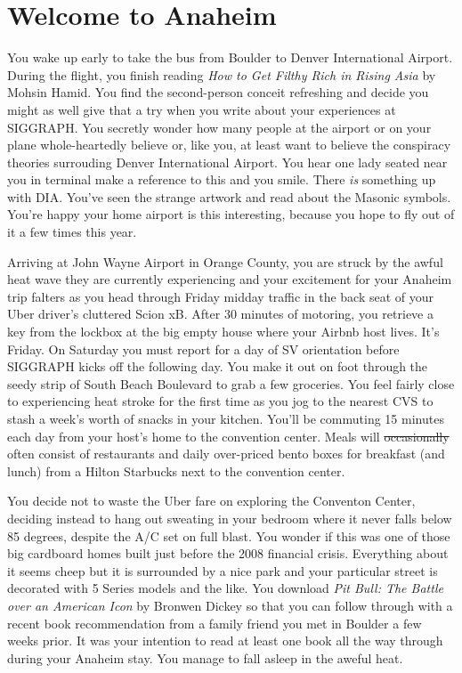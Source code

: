 \documentclass[../main.tex]{subfiles}
\begin{document}
\section{Welcome to Anaheim}

You wake up early to take the bus from Boulder to Denver International Airport. During the flight, you finish reading \textit{How to Get Filthy Rich in Rising Asia} by Mohsin Hamid. You find the second-person conceit refreshing and decide you might as well give that a try when you write about your experiences at SIGGRAPH. You secretly wonder how many people at the airport or on your plane whole-heartedly believe or, like you, at least want to believe the conspiracy theories surrouding Denver International Airport. You hear one lady seated near you in terminal make a reference to this and you smile. There \textit{is} something up with DIA. You've seen the strange artwork and read about the Masonic symbols. You're happy your home airport is this interesting, because you hope to fly out of it a few times this year.

Arriving at John Wayne Airport in Orange County, you are struck by the awful heat wave they are currently experiencing and your excitement for your Anaheim trip falters as you head through Friday midday traffic in the back seat of your Uber driver's cluttered Scion xB. After 30 minutes of motoring, you retrieve a key from the lockbox at the big empty house where your Airbnb host lives. It's Friday. On Saturday you must report for a day of SV orientation before SIGGRAPH kicks off the following day. You make it out on foot through the seedy strip of South Beach Boulevard to grab a few groceries. You feel fairly close to experiencing heat stroke for the first time as you jog to the nearest CVS to stash a week's worth of snacks in your kitchen. You'll be commuting 15 minutes each day from your host's home to the convention center. Meals will \sout{occasionally} often consist of restaurants and daily over-priced bento boxes for breakfast (and lunch) from a Hilton Starbucks next to the convention center.

You decide not to waste the Uber fare on exploring the Conventon Center, deciding instead to hang out sweating in your bedroom where it never falls below 85 degrees, despite the A/C set on full blast. You wonder if this was one of those big cardboard homes built just before the 2008 financial crisis. Everything about it seems cheep but it is surrounded by a nice park and your particular street is decorated with 5 Series models and the like. You download \textit{Pit Bull: The Battle over an American Icon} by Bronwen Dickey so that you can follow through with a recent book recommendation from a family friend you met in Boulder a few weeks prior. It was your intention to read at least one book all the way through during your Anaheim stay. You manage to fall asleep in the aweful heat.
 
\end{document}

